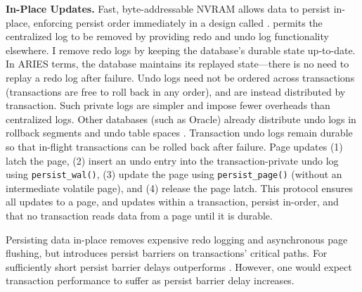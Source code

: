\textbf{In-Place Updates.}
Fast, byte-addressable NVRAM allows data to persist in-place, enforcing persist order immediately in a design called \InPlace.
\InPlace permits the centralized log to be removed by providing redo and undo log functionality elsewhere.
I remove redo logs by keeping the database's durable state up-to-date.
In ARIES terms, the database maintains its replayed state---there is no need to replay a redo log after failure.
Undo logs need not be ordered across transactions (transactions are free to roll back in any order), and are instead distributed by transaction.
Such private logs are simpler and impose fewer overheads than centralized logs.
Other databases (such as Oracle) already distribute undo logs in rollback segments and undo table spaces \cite{OracleDoc}.
Transaction undo logs remain durable so that in-flight transactions can be rolled back after failure.
Page updates (1) latch the page, (2) insert an undo entry into the transaction-private undo log using \texttt{persist\_wal()}, (3) update the page using \texttt{persist\_page()} (without an intermediate volatile page), and (4) release the page latch.
This protocol ensures all updates to a page, and updates within a transaction, persist in-order, and that no transaction reads data from a page until it is durable.

Persisting data in-place removes expensive redo logging and asynchronous page flushing, but introduces persist barriers on transactions' critical paths.
For sufficiently short persist barrier delays \InPlace outperforms \NVDisk.
However, one would expect transaction performance to suffer as persist barrier delay increases.

